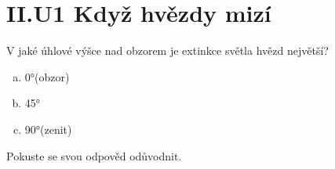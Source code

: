 \documentclass{../../../../style/mkimain}
\begin{document}
\section*{II.U1 Když hvězdy mizí}
\noindent
V jaké úhlové výšce nad obzorem je extinkce světla hvězd největší?  
\begin{enumerate}[a)]
    \item \ang{0}(obzor)
    \item \ang{45}
    \item \ang{90}(zenit)
\end{enumerate}  
Pokuste se svou odpověd odůvodnit.
\end{document}
